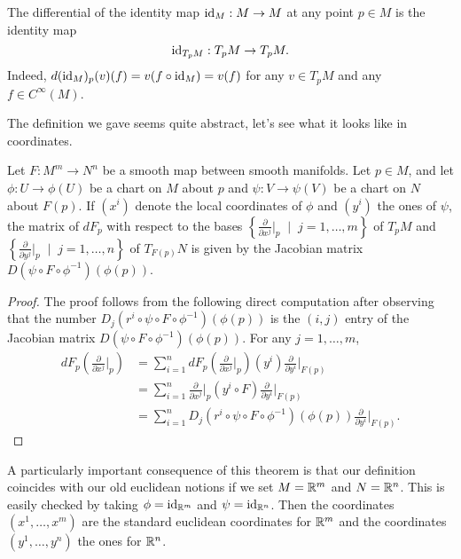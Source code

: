 \begin{rmk}
    The differential of the identity map $\operatorname{id}_M:M\to M$ at any point $p\in M$ is the identity map
    \begin{equation}
        \operatorname{id}_{T_pM}: T_pM \to T_pM.
    \end{equation}
    Indeed, $d (\operatorname{id}_M)_p(v)(f) = v(f\circ\operatorname{id}_M) = v(f)$ for any $v\in T_pM$ and any $f\in C^\infty(M)$.
\end{rmk}

The definition we gave seems quite abstract, let's see what it looks like in coordinates.

\begin{prop}\label{prop:DiffCoords}
    Let $F:M^m\to N^n$ be a smooth map between smooth manifolds.
    Let $p\in M$, and let $\phi : U \to \phi(U)$ be a chart on $M$ about $p$ and $\psi: V \to \psi(V)$ be a chart on $N$ about $F(p)$.
    If $(x^i)$ denote the local coordinates of $\phi$ and $(y^i)$ the ones of $\psi$, the matrix of $dF_p$ with respect to the bases $\left\{\frac{\partial}{\partial x^j}\big|_p \;\mid\; j=1,\ldots,m\right\}$ of $T_pM$ and $\left\{\frac{\partial}{\partial y^j}\big|_p \;\mid\; j=1,\ldots,n\right\}$ of $T_{F(p)}N$ is given by the Jacobian matrix $D(\psi\circ F \circ\phi^{-1})(\phi(p))$.
\end{prop}
\begin{proof}
    The proof follows from the following direct computation after observing that the number $D_j(r^i \circ \psi \circ F \circ \phi^{-1})(\phi(p))$ is the $(i,j)$ entry of the Jacobian matrix $D(\psi\circ F \circ\phi^{-1})(\phi(p))$. For any $j=1,\ldots,m$,
    \begin{align}
        dF_p \left(\frac{\partial}{\partial x^j}\Big|_p\right)
        &= \sum_{i=1}^n dF_p \left(\frac{\partial}{\partial x^j}\Big|_p\right) (y^i) \frac{\partial}{\partial y^i}\Big|_{F(p)} \\
        &= \sum_{i=1}^n \frac{\partial}{\partial x^j}\Big|_p (y^i \circ F) \frac{\partial}{\partial y^i}\Big|_{F(p)} \\
        &=\sum_{i=1}^n D_j(r^i \circ \psi \circ F \circ \phi^{-1})(\phi(p)) \frac{\partial}{\partial y^i}\Big|_{F(p)}.
    \end{align}
\end{proof}

A particularly important consequence of this theorem is that our definition coincides with our old euclidean notions if we set $M=\mathbb{R}^m$ and $N=\mathbb{R}^n$.
This is easily checked by taking $\phi = \operatorname{id}_{\mathbb{R}^m}$ and $\psi=\operatorname{id}_{\mathbb{R}^n}$.
Then the coordinates $(x^1,\ldots,x^m)$ are the standard euclidean coordinates for $\mathbb{R}^m$ and the coordinates $(y^1,\ldots,y^n)$ the ones for $\mathbb{R}^n$.

